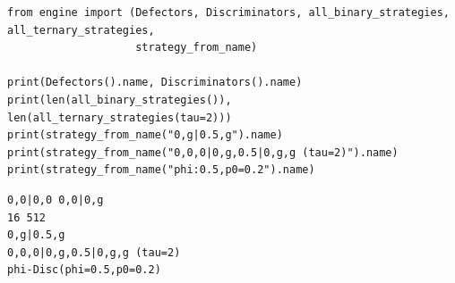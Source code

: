 \begin{lstlisting}[style=code]
from engine import (Defectors, Discriminators, all_binary_strategies, all_ternary_strategies,
                    strategy_from_name)

print(Defectors().name, Discriminators().name)
print(len(all_binary_strategies()), len(all_ternary_strategies(tau=2)))
print(strategy_from_name("0,g|0.5,g").name)
print(strategy_from_name("0,0,0|0,g,0.5|0,g,g (tau=2)").name)
print(strategy_from_name("phi:0.5,p0=0.2").name)
\end{lstlisting}
\begin{lstlisting}[style=output]
0,0|0,0 0,0|0,g
16 512
0,g|0.5,g
0,0,0|0,g,0.5|0,g,g (tau=2)
phi-Disc(phi=0.5,p0=0.2)
\end{lstlisting}
